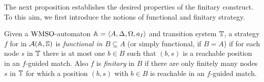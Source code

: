 \begin{comment} Remark on minimality
\begin{remark} Let $\mb{A}^{\f}$ be the finitary construct of some $\wmso$-automaton $\mb{A}$ and $\model$ an input model. While playing the acceptance game $\mathcal{A}(\mb{A}^{\f},\model)$, it is in $\exists$'s interest to make the fewest number of moves available for $\forall$. Thus at any position $(q,s) \in A^{\f} \times T$, a rational choice for her would be to assign to each node in $\sigma_R(s)$ only the ``strictly necessary'' amount of states that makes $\Delta^{\f}(q,\V(s))$ true. Following this intuition, we can always assume the following on $\exists$'s strategy $f$ in $\mathcal{A}(\mb{A}^{\f},\model)$:
\begin{itemize}
  \item from any position of the form $(a,s) \in A \times T$, the valuation suggested by $f$ only assigns predicates from $A$ to nodes in $\R{s}$;
  \item from any position of the form $(R,s) \in \shA \times T$, the valuation suggested by $f$ assigns either only predicates from $A$ or only predicates from $\shA$ to nodes in $\R{s}$.
\end{itemize}
The first assumption can be made as only predicates from $A$ appear in $\Delta^{\f}(a,\V(s)) = \Delta(a,\V(s)$, whereas the second depends upon the fact that $\Delta^{\f}(R,\V(s))$ consists of two disjuncts
By assuming that $\exists$ plays according to this idea of rationality, we can rule out redundant valuations such as $\val^{\prime}$. Following these intuitions, we introduce the notion of \emph{minimal strategy}.
\end{remark}
\end{comment}

The next proposition establishes the desired properties of the finitary
construct. To this aim, we first introduce the notions of functional and finitary strategy.

\begin{definition}\label{def:StratfunctionalFinitary}
Given a $\mathrm{WMSO}$-automaton $\mathbb{A} = \langle{A,\Delta,\Omega,a_I}\rangle$ and transition system $\mathbb{T}$, a strategy $f$ for \eloise in $\mathcal{A}(\mathbb{A},\mathbb{S})$ is \emph{functional in $B \subseteq A$} (or simply functional, if $B=A$) if for each node $s$ in $\mathbb{T}$ there is at most one $b \in B$ such that $(b,s)$ is a reachable position in an $f$-guided match. Also $f$ is \emph{finitary} in $B$ if there are only finitely many nodes $s$ in $\mathbb{T}$ for which a position $(b,s)$ with $b \in B$ is reachable in an $f$-guided match.
\end{definition}

